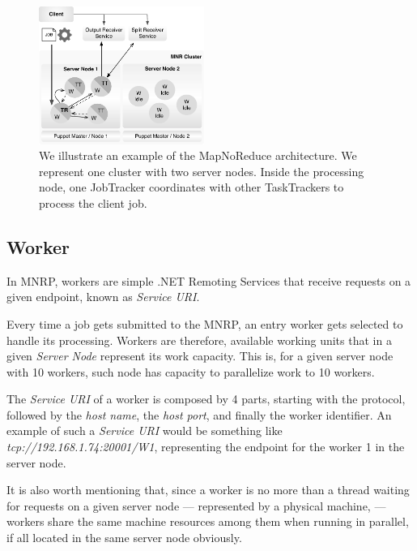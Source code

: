 \documentclass[times, 10pt,twocolumn]{article}
\begin{document}
        \begin{figure}[!h]
            \begin{center}
                \includegraphics[width=0.48\textwidth]{pics/architecture.pdf}
                \caption{We illustrate an example of the MapNoReduce architecture. We represent one cluster with two server nodes. Inside the processing node, one JobTracker coordinates with other TaskTrackers to process the client job.  }
                \label{fig:mnr-architecture}
            \end{center}
        \end{figure}
        
    	\subsection{Worker}
        
        In \ac{MNRP}, workers are simple .NET Remoting Services that receive requests on a given endpoint, known as \emph{Service URI}. 
        
        Every time a job gets submitted to the \ac{MNRP}, an entry worker gets selected to handle its processing. Workers are therefore, available working units that in a given \emph{Server Node} represent its work capacity. This is, for a given server node with 10 workers, such node has capacity to parallelize work to 10 workers.
        
        The \emph{Service URI} of a worker is composed by 4 parts, starting with the protocol, followed by the \emph{host name}, the \emph{host port}, and finally the worker identifier. An example of such a \emph{Service URI} would be something like \emph{{\small tcp://192.168.1.74:20001/W1}}, representing the endpoint for the worker 1 in the server node.
        
        It is also worth mentioning that, since a worker is no more than a thread waiting for requests on a given server node — represented by a physical machine, — workers share the same machine resources among them when running in parallel, if all located in the same server node obviously.
        
\end{document}
